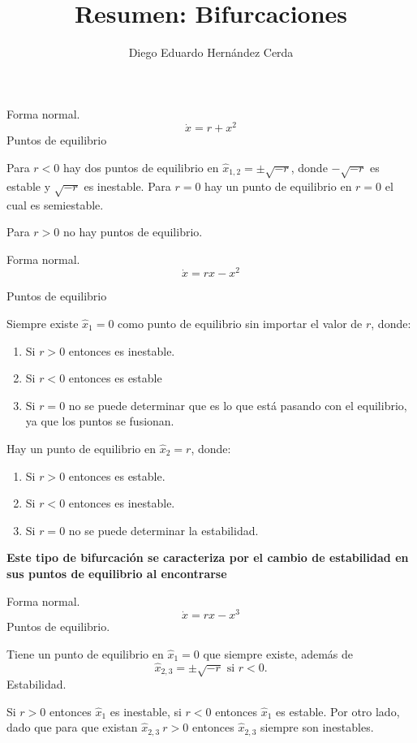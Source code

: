 \documentclass[letterpaper]{article}
\title{Resumen: Bifurcaciones}
\author{Diego Eduardo Hernández Cerda\\
}
\begin{document}
\maketitle

\begin{tcolorbox}[colback=YellowGreen!10, colframe=YellowGreen, title=Tipos de bifurcaciones y características, center title, fonttitle=\bfseries]


  Forma normal. $$
  \dot{x}=r+x^2
  $$
  Puntos de equilibrio 

  Para $r<0$ hay dos puntos de equilibrio en  $\hat{x}_{1,2}= \pm \sqrt{-r}$, donde $-\sqrt{-r}$ es estable y $\sqrt{-r}$ es inestable.
  Para $r=0$ hay un punto de equilibrio en $r=0$ el cual es semiestable.
  
  Para $r>0$ no hay puntos de equilibrio.


  Forma normal.
  $$
  \dot{x}=rx-x^2  $$

  Puntos de equilibrio

  Siempre existe $\hat{x}_1=0$ como punto de equilibrio sin importar el valor de $r$, donde:
  \begin{enumerate}
    \item Si $r>0$ entonces es inestable.
      \item Si $r < 0$ entonces es estable
	\item Si $r = 0$ no se puede determinar que es lo que está pasando con el equilibrio, ya que los puntos se fusionan.
  \end{enumerate}

  Hay un punto de equilibrio en $\hat{x}_{2}=r$, donde:
  \begin{enumerate}
    \item Si $r>0$ entonces es estable.
      \item Si $r<0$ entonces es inestable.
	\item Si $r=0$ no se puede determinar la estabilidad. 
  \end{enumerate}

  \textbf{Este tipo de bifurcación se caracteriza por el cambio de estabilidad en sus puntos de equilibrio al encontrarse}      

  Forma normal.
  $$
  \dot{x} =rx-x^3
  $$
  Puntos de equilibrio.

  Tiene un punto de equilibrio en $\hat{x}_1=0$ que siempre existe, además de $$
  \hat{x}_{2,3} = \pm \sqrt{-r} \text{ si } r<0.
  $$
  Estabilidad.

  Si $r>0$ entonces $\hat{x}_1$ es inestable, si $r<0$ entonces $\hat{x}_1$ es estable.
  Por otro lado, dado que para que existan $\hat{x}_{2,3} \ r>0$ entonces $\hat{x}_{2,3}$ siempre son inestables. 
\end{tcolorbox}
\end{document}
